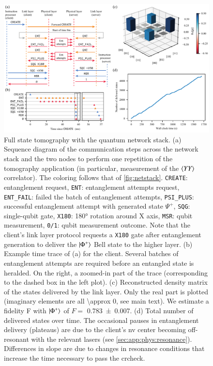 \begin{figure}
    \centering
    \includegraphics[width=\linewidth]{figures/fstomography.pdf}
    \caption{
        Full state tomography with the quantum network stack.
        (a) Sequence diagram of the communication steps across the network stack and the two nodes
        to perform one repetition of the tomography application (in particular, measurement of the
        $\braket{YY}$ correlator). The coloring follows that of \cref{fig:netstack}.
        \texttt{CREATE}: entanglement request, \texttt{ENT}: entanglement attempts request,
        \texttt{ENT\_FAIL}: failed the batch of entanglement attempts, \texttt{PSI\_PLUS}:
        successful entanglement attempt with generated state $\Psi^+$, \texttt{SQG}: single-qubit
        gate, \texttt{X180}: \ang{180} rotation around X axis, \texttt{MSR}: qubit measurement,
        \texttt{0/1}: qubit measurement outcome. Note that the client's link layer protocol requests
        a \texttt{X180} gate after entanglement generation to deliver the $\ket{\Phi^+}$ Bell state
        to the higher layer.
        (b) Example time trace of (a) for the client. Several batches of entanglement attempts are
        required before an entangled state is heralded. On the right, a zoomed-in part of the trace
        (corresponding to the dashed box in the left plot).
        (c) Reconstructed density matrix of the states delivered by the link layer. Only the real
        part is plotted (imaginary elements are all \num{\approx 0}, see main text). We estimate a
        fidelity F with $\ket{\Phi^+}$ of $F =$ \num{0.783(7)}.
        (d) Total number of delivered states over time. The occasional pauses in entanglement
        delivery (plateaus) are due to the client's \acrshort{nv} center becoming off-resonant with
        the relevant lasers (see \cref{sec:app:phys:resonance}). Differences in slope are due to
        changes in resonance conditions that increase the time necessary to pass the
        \acrlong{crcheck}.
    }
    \label{fig:fstomography}
\end{figure}

